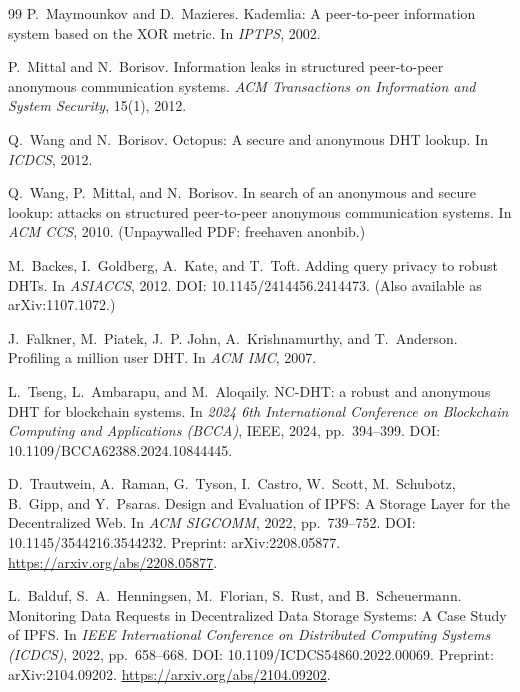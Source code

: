 \documentclass[11pt]{article}
\begin{document}
\begin{thebibliography}{99}
P.~Maymounkov and D.~Mazieres.
\newblock Kademlia: A peer-to-peer information system based on the XOR metric.
\newblock In \emph{IPTPS}, 2002.

P.~Mittal and N.~Borisov.
\newblock Information leaks in structured peer-to-peer anonymous communication systems.
\newblock \emph{ACM Transactions on Information and System Security}, 15(1), 2012.

Q.~Wang and N.~Borisov.
\newblock Octopus: A secure and anonymous DHT lookup.
\newblock In \emph{ICDCS}, 2012.

Q.~Wang, P.~Mittal, and N.~Borisov.
\newblock In search of an anonymous and secure lookup: attacks on structured peer-to-peer anonymous communication systems.
\newblock In \emph{ACM CCS}, 2010. (Unpaywalled PDF: freehaven anonbib.)

M.~Backes, I.~Goldberg, A.~Kate, and T.~Toft.
\newblock Adding query privacy to robust DHTs.
\newblock In \emph{ASIACCS}, 2012.
\newblock DOI: 10.1145/2414456.2414473.
\newblock (Also available as arXiv:1107.1072.)

J.~Falkner, M.~Piatek, J.~P. John, A.~Krishnamurthy, and T.~Anderson.
\newblock Profiling a million user DHT.
\newblock In \emph{ACM IMC}, 2007.

L.~Tseng, L.~Ambarapu, and M.~Aloqaily.
\newblock NC-DHT: a robust and anonymous DHT for blockchain systems.
\newblock In \emph{2024 6th International Conference on Blockchain Computing and Applications (BCCA)}, IEEE, 2024, pp.~394--399.
\newblock DOI: 10.1109/BCCA62388.2024.10844445.

D.~Trautwein, A.~Raman, G.~Tyson, I.~Castro, W.~Scott, M.~Schubotz, B.~Gipp, and Y.~Psaras.
\newblock Design and Evaluation of {IPFS}: A Storage Layer for the Decentralized Web.
\newblock In \emph{ACM SIGCOMM}, 2022, pp.~739--752.
\newblock DOI: 10.1145/3544216.3544232.
\newblock Preprint: arXiv:2208.05877.
\newblock \url{https://arxiv.org/abs/2208.05877}.


L.~Balduf, S.~A.~Henningsen, M.~Florian, S.~Rust, and B.~Scheuermann.
\newblock Monitoring Data Requests in Decentralized Data Storage Systems: A Case Study of {IPFS}.
\newblock In \emph{IEEE International Conference on Distributed Computing Systems (ICDCS)}, 2022, pp.~658--668.
\newblock DOI: 10.1109/ICDCS54860.2022.00069.
\newblock Preprint: arXiv:2104.09202.
\newblock \url{https://arxiv.org/abs/2104.09202}.


\end{thebibliography}
\end{document}
